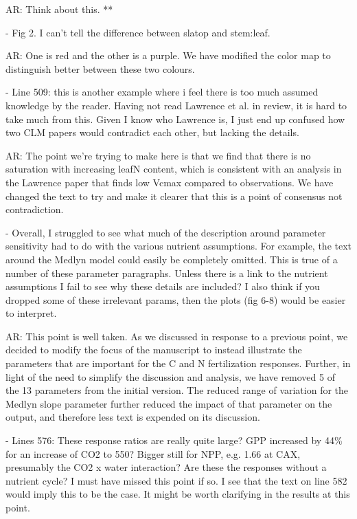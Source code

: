 \documentclass{article}
\begin{document}
\textsf{AR: Think about this. **}

- Fig 2. I can't tell the difference between slatop and stem:leaf. 

\textsf{AR: One is red and the other is a purple.  We have modified the color map to distinguish better between these two colours.}

- Line 509: this is another example where i feel there is too much assumed knowledge by the reader. Having not read Lawrence et al. in review, it is hard to take much from this. Given I know who Lawrence is, I just end up confused how two CLM papers would contradict each other, but lacking the details. 

\textsf{AR: The point we're trying to make here is that we find that there is no saturation with increasing leafN content, which is consistent with an analysis in the Lawrence paper that finds low Vcmax compared to observations. We have changed the text to try and make it clearer that this is a point of consensus not contradiction.}

- Overall, I struggled to see what much of the description around parameter sensitivity had to do with the various nutrient assumptions. For example, the text around the Medlyn model could easily be completely omitted. This is true of a number of these parameter paragraphs. Unless there is a link to the nutrient assumptions I fail to see why these details are included? I also think if you dropped some of these irrelevant params, then the plots (fig 6-8) would be easier to interpret.

\textsf{AR: This point is well taken. As we discussed in response to a previous point, we decided to modify the focus of the manuscript to instead illustrate the parameters that are important for the C and N fertilization responses. Further, in light of the need to simplify the discussion and analysis, we have removed 5 of the 13 parameters from the initial version. The reduced range of variation for the Medlyn slope parameter further reduced the impact of that parameter on the output, and therefore less text is expended on its discussion.}

- Lines 576: These response ratios are really quite large? GPP increased by 44\% for an increase of CO2 to 550? Bigger still for NPP, e.g. 1.66 at CAX, presumably the CO2 x water interaction? Are these the responses without a nutrient cycle? I must have missed this point if so. I see that the text on line 582 would imply this to be the case. It might be worth clarifying in the results at this point. 
\end{document}
